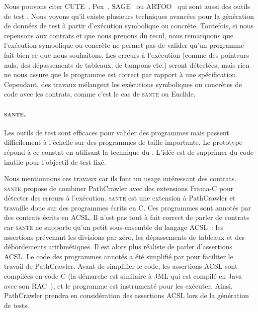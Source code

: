 Nous pouvons citer CUTE~, Pex~,
SAGE~ ou ARTOO~ qui sont aussi des outils
de test . Nous voyons qu'il existe plusieurs techniques
avancées pour la génération de données de test à partir d'exécution symbolique
ou concrète. Toutefois, si nous repensons aux contrats et que nous prenons du
recul, nous remarquons que l'exécution symbolique ou concrète ne permet pas de
valider qu'un programme fait bien ce que nous souhaitons. Les erreurs à
l'exécution (comme des pointeurs nuls, des dépassements de tableaux, de tampons
etc.) seront détectées, mais rien ne nous assure que le programme est correct
par rapport à une spécification. Cependant, des travaux mélangent les exécutions
symboliques ou concrètes de code avec les contrats, comme c'est le cas de
{\scshape sante} ou Euclide.

\paragraph{\scshape sante.} Les outils de test  sont
efficaces pour valider des programmes mais passent difficilement à l'échelle sur
des programmes de taille importante. Le prototype~~ répond à ce constat en utilisant la technique du
. L'idée est de supprimer du code inutile pour l'objectif de
test fixé.

Nous mentionnons ces travaux car ils font un usage intéressant des contrats.
{\scshape sante} propose de combiner PathCrawler avec des extensions Frama-C
pour détecter des erreurs à l'exécution. {\scshape sante} est une extension à
PathCrawler et travaille donc sur des programmes écrits en C. Ces programmes
sont annotés par des contrats écrits en ACSL. Il n'est pas tout à fait correct
de parler de contrats car {\scshape sante} ne supporte qu'un petit sous-ensemble
du langage ACSL~: les assertions prévenant les divisions par zéro, les
dépassements de tableaux et des débordements arithmétiques. Il est alors plus
réaliste de parler d'assertions ACSL. Le code des programmes annotés a été
simplifié par  pour faciliter le travail de PathCrawler.
Avant de simplifier le code, les assertions ACSL sont compilées en code C (la
démarche est similaire à JML qui est compilé en Java avec son
RAC~), et le programme est instrumenté pour les exécuter.
Ainsi, PathCrawler prendra en considération des assertions ACSL lors de la
génération de tests.

